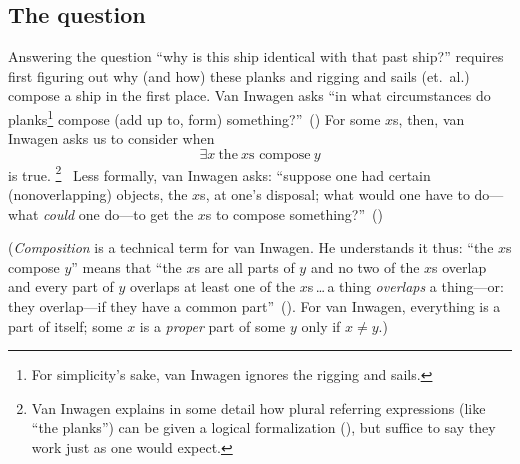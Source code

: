 \documentclass[11pt]{article}
\begin{document}
\begin{spacing}{1.5}
\subsection{The question}
Answering the question ``why is this ship identical with that past ship?'' requires first figuring out why (and how) these planks and rigging and sails (et.\ al.) compose a ship in the first place. Van Inwagen asks ``in what circumstances do planks\footnote{For simplicity's sake, van Inwagen ignores the rigging and sails.} compose (add up to, form) something?''~(\citeyear[21]{inwagen1995}) For some $x$s, then, van Inwagen asks us to consider when
\begin{equation}
\exists x\ \text{the}\ x\text{s compose}\ y
\end{equation}
is true.%
\footnote{Van Inwagen explains in some detail how plural referring expressions (like ``the planks'') can be given a logical formalization (\citeyear[23--28]{inwagen1995}), but suffice to say they work just as one would expect.}%
%
\ Less formally, van Inwagen asks: ``suppose one had certain (nonoverlapping) objects, the $x$s, at one's disposal; what would one have to do---what {\em could} one do---to get the $x$s to compose something?''~(\citeyear[31]{inwagen1995})

({\em Composition} is a technical term for van Inwagen. He understands it thus: ``the $x$s compose $y$'' means that ``the $x$s are all parts of $y$ and no two of the $x$s overlap and every part of $y$ overlaps at least one of the $x$s\,\ldots\,a thing {\em overlaps} a thing---or: they overlap---if they have a common part''~(\citeyear[29]{inwagen1995}). For van Inwagen, everything is a part of itself; some $x$ is a {\em proper} part of some $y$ only if $x \neq y$.)


\end{spacing}
\end{document}
